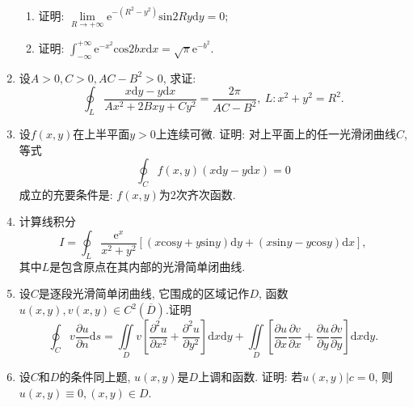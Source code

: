 \begin{enumerate}
\begin{enumerate}
		\item 证明: $\displaystyle{\lim\limits_{R\rightarrow +\infty}\mathrm{e}^{-(R^2-y^2)}\mathrm{sin}2Ry\mathrm{d}y=0}$;
		\item 证明: $\displaystyle{\int_{-\infty}^{+\infty}\mathrm{e}^{-x^2}\mathrm{cos}2bx\mathrm{d}x=\sqrt{\pi}\mathrm{e}^{-b^2}}$.
\end{enumerate}
\item 设$A>0, C>0, AC-B^2>0$, 求证:
$$ \displaystyle{\oint_{L}\frac{x\mathrm{d}y-y\mathrm{d}x}{Ax^2+2Bxy+Cy^2}=\frac{2\pi}{AC-B^2}},\  L: x^2 + y^2 = R^2.$$
\item 设$f(x,y)$在上半平面$y>0$上连续可微. 证明: 对上平面上的任一光滑闭曲线$C$, 等式
$$ \displaystyle{\oint_{C}f(x,y)(x\mathrm{d}y-y\mathrm{d}x)=0}$$
成立的充要条件是: $f(x,y)$为2次齐次函数.
\item 计算线积分
	$$ I = \displaystyle{\oint_{L}\frac{\mathrm{e}^x}{x^2+y^2}[(x\mathrm{cos}y+y\mathrm{sin}y)\mathrm{d}y+(x\mathrm{sin}y-y\mathrm{cos}y)\mathrm{d}x]},$$
	其中$L$是包含原点在其内部的光滑简单闭曲线.
	\item 设$C$是逐段光滑简单闭曲线, 它围成的区域记作$D$, 函数$u(x,y),v(x,y)\in C^2(\overline{D})$.证明$$
	\displaystyle{\oint_{C}v\frac{\partial u}{\partial n}\mathrm{d}s=\iint\limits_{D}v[\frac{\partial^2 u}{\partial x^2}+\frac{\partial^2u}{\partial y^2}]\mathrm{d}x\mathrm{d}y+\iint\limits_{D}[\frac{\partial u}{\partial x}\frac{\partial v}{\partial x}+\frac{\partial u}{\partial y}\frac{\partial v}{\partial y}]\mathrm{d}x\mathrm{d}y}.$$
	\item 设$C$和$D$的条件同上题, $u(x,y)$是$D$上调和函数. 证明: 若$u(x,y)|c=0$, 则$u(x,y)\equiv 0,(x,y)\in D$. 
\end{enumerate}
